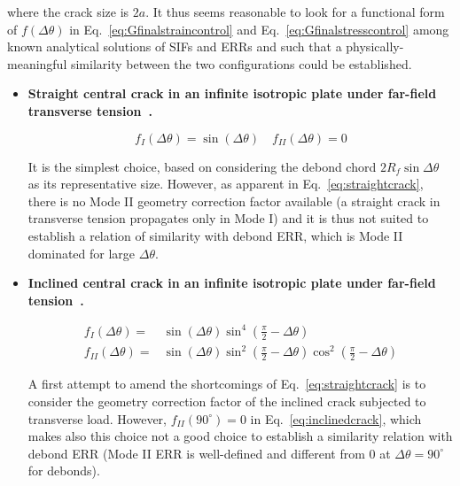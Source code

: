 \documentclass[review]{elsarticle}
\begin{document}
where the crack size is $2a$. It thus seems reasonable to look for a functional form of $f\left(\Delta\theta\right)$ in Eq.~\ref{eq:Gfinalstraincontrol} and Eq.~\ref{eq:Gfinalstresscontrol} among known analytical solutions of SIFs and ERRs and such that a physically-meaningful similarity between the two configurations could be established.

\begin{itemize}
\item \textbf{Straight central crack in an infinite isotropic plate under far-field transverse tension~\cite{Tada2000}.}

\begin{equation}\label{eq:straightcrack}
f_{I}\left(\Delta\theta\right)=\sin\left(\Delta\theta\right)\quad f_{II}\left(\Delta\theta\right)=0
\end{equation}

It is the simplest choice, based on considering the debond chord $2R_{f}\sin{\Delta\theta}$ as its representative size. However, as apparent in Eq.~\ref{eq:straightcrack}, there is no Mode II geometry correction factor available (a straight crack in transverse tension propagates only in Mode I) and it is thus not suited to establish a relation of similarity with debond ERR, which is Mode II dominated for large $\Delta\theta$.

\item \textbf{Inclined central crack in an infinite isotropic plate under far-field tension~\cite{Tada2000}.}

\begin{equation}\label{eq:inclinedcrack}
\begin{aligned}
f_{I}\left(\Delta\theta\right)=&\sin\left(\Delta\theta\right)\sin^{4}\left(\frac{\pi}{2}-\Delta\theta\right)\\ f_{II}\left(\Delta\theta\right)=&\sin\left(\Delta\theta\right)\sin^{2}\left(\frac{\pi}{2}-\Delta\theta\right)\cos^{2}\left(\frac{\pi}{2}-\Delta\theta\right)
\end{aligned}
\end{equation}

A first attempt to amend the shortcomings of Eq.~\ref{eq:straightcrack} is to consider the geometry correction factor of the inclined crack subjected to transverse load. However, $f_{II}\left(90^{\circ}\right)=0$ in Eq.~\ref{eq:inclinedcrack}, which makes also this choice not a good choice to establish a similarity relation with debond ERR (Mode II ERR is well-defined and different from $0$ at $\Delta\theta=90^{\circ}$ for debonds).


\end{itemize}
\end{document}
